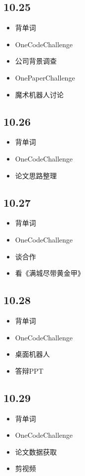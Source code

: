 \documentclass[UTF8]{ctexart}
\begin{document}
\subsection*{10.25}
\begin{itemize}
    \item 背单词
    \item OneCodeChallenge
    \item 公司背景调查
    \item OnePaperChallenge
    \item 魔术机器人讨论
\end{itemize}

\subsection*{10.26}
\begin{itemize}
    \item 背单词
    \item OneCodeChallenge
    \item 论文思路整理
\end{itemize}

\subsection*{10.27}
\begin{itemize}
    \item 背单词
    \item OneCodeChallenge
    \item 谈合作
    \item 看《满城尽带黄金甲》
\end{itemize}

\subsection*{10.28}
\begin{itemize}
    \item 背单词
    \item OneCodeChallenge
    \item 桌面机器人
    \item 答辩PPT
\end{itemize}

\subsection*{10.29}
\begin{itemize}
    \item 背单词
    \item OneCodeChallenge
    \item 论文数据获取
    \item 剪视频
\end{itemize}
\end{document}
